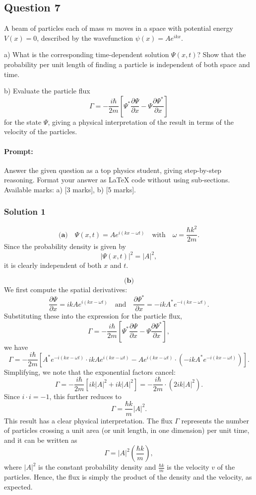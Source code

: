 \documentclass{article}
\begin{document}
\subsection{Question 7}
A beam of particles each of mass $m$ moves in a space with potential energy $V(x) = 0$, described by the wavefunction $\psi(x) = A e^{ikx}$.  

a) What is the corresponding time-dependent solution $\Psi(x,t)$? Show that the probability per unit length of finding a particle is independent of both space and time.  

b) Evaluate the particle flux  
\[
\Gamma = -\frac{i \hbar}{2m} \left[ \Psi^* \frac{\partial \Psi}{\partial x} - \Psi \frac{\partial \Psi^*}{\partial x} \right]
\]
for the state $\Psi$, giving a physical interpretation of the result in terms of the velocity of the particles.


\paragraph{Prompt: \\} 
Answer the given question as a top physics student, giving step-by-step reasoning. Format your answer as LaTeX code without using sub-sections. Available marks: a) [3 marks], b) [5 marks].

\subsubsection{Solution 1}
\[
\textbf{(a)}\quad \Psi(x,t) = A e^{i(kx-\omega t)} \quad \text{with} \quad \omega = \frac{\hbar k^2}{2m}.
\]
Since the probability density is given by 
\[
|\Psi(x,t)|^2 = |A|^2,
\]
it is clearly independent of both \( x \) and \( t \).

\[
\textbf{(b)}
\]
We first compute the spatial derivatives:
\[
\frac{\partial \Psi}{\partial x} = ikA e^{i(kx-\omega t)} \quad \text{and} \quad \frac{\partial \Psi^*}{\partial x} = -ikA^* e^{-i(kx-\omega t)}.
\]
Substituting these into the expression for the particle flux,
\[
\Gamma = -\frac{i\hbar}{2m} \left[ \Psi^* \frac{\partial \Psi}{\partial x} - \Psi \frac{\partial \Psi^*}{\partial x} \right],
\]
we have
\[
\Gamma = -\frac{i\hbar}{2m} \left[ A^* e^{-i(kx-\omega t)} \cdot ikA e^{i(kx-\omega t)} - A e^{i(kx-\omega t)} \cdot \left(-ikA^* e^{-i(kx-\omega t)}\right) \right].
\]
Simplifying, we note that the exponential factors cancel:
\[
\Gamma = -\frac{i\hbar}{2m} \left[ ik|A|^2 + ik|A|^2 \right] = -\frac{i\hbar}{2m} \cdot (2ik|A|^2).
\]
Since \( i \cdot i = -1 \), this further reduces to
\[
\Gamma = \frac{\hbar k}{m}|A|^2.
\]
This result has a clear physical interpretation. The flux \(\Gamma\) represents the number of particles crossing a unit area (or unit length, in one dimension) per unit time, and it can be written as
\[
\Gamma = |A|^2 \left(\frac{\hbar k}{m}\right),
\]
where \(|A|^2\) is the constant probability density and \(\frac{\hbar k}{m}\) is the velocity \(v\) of the particles. Hence, the flux is simply the product of the density and the velocity, as expected.
\end{document}
